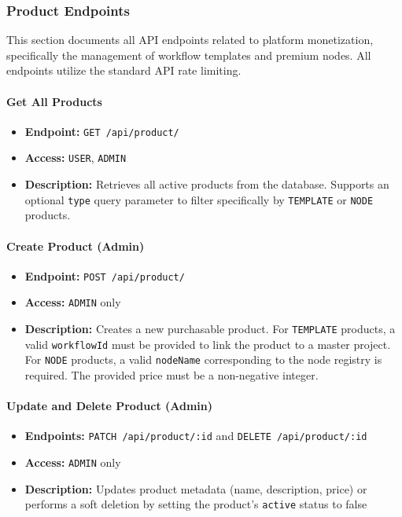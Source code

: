 \subsubsection{Product Endpoints}
\label{subsec:product-endpoints}

This section documents all API endpoints related to platform monetization, specifically the management of workflow templates and premium nodes. All endpoints utilize the standard API rate limiting.

\paragraph{Get All Products}
\begin{itemize}
  \item \textbf{Endpoint:} \texttt{GET /api/product/}
  \item \textbf{Access:} \texttt{USER}, \texttt{ADMIN}
  \item \textbf{Description:} Retrieves all active products from the database. Supports an optional \texttt{type} query parameter to filter specifically by \texttt{TEMPLATE} or \texttt{NODE} products.
\end{itemize}

\paragraph{Create Product (Admin)}
\begin{itemize}
  \item \textbf{Endpoint:} \texttt{POST /api/product/}
  \item \textbf{Access:} \texttt{ADMIN} only
  \item \textbf{Description:} Creates a new purchasable product. For \texttt{TEMPLATE} products, a valid \texttt{workflowId} must be provided to link the product to a master project. For \texttt{NODE} products, a valid \texttt{nodeName} corresponding to the node registry is required. The provided price must be a non-negative integer.
\end{itemize}

\paragraph{Update and Delete Product (Admin)}
\begin{itemize}
  \item \textbf{Endpoints:} \texttt{PATCH /api/product/:id} and \texttt{DELETE /api/product/:id}
  \item \textbf{Access:} \texttt{ADMIN} only
  \item \textbf{Description:} Updates product metadata (name, description, price) or performs a soft deletion by setting the product's \texttt{active} status to false
\end{itemize}

